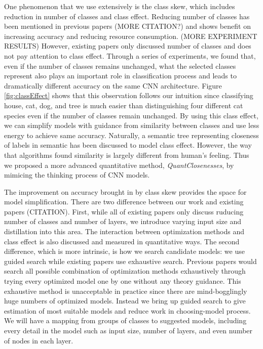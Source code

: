 \documentclass{article}
\begin{document}
One phenomenon that we use extensively is the class skew, which includes reduction in number of classes and class effect. Reducing number of classes has been mentioned in previous papers \cite{han2016mcdnn} \cite{shen2016fast} (MORE CITATION?) and shows benefit on increasing accuracy and reducing resource consumption. (MORE EXPERIMENT RESULTS) However, existing papers only discussed number of classes and does not pay attention to class effect. Through a series of experiments, we found that, even if the number of classes remains unchanged, what the selected classes represent also plays an important role in classification process and leads to dramatically different accuracy on the same CNN architecture. Figure \ref{fig:classEffect} shows that this observation follows our intuition since classifying house, cat, dog, and tree is much easier than distinguishing four different cat species even if the number of classes remain unchanged. By using this class effect, we can simplify models with guidance from similarity between classes and use less energy to achieve same accuracy. Naturally, a semantic tree representing closeness of labels in semantic has been discussed to model class effect. However, the way that algorithms found similarity is largely different from human's feeling. Thus we proposed a more advanced quantitative method, \textit{QuantClosenesses}, by mimicing the thinking process of CNN models. 

The improvement on accuracy brought in by class skew provides the space for model simplification. There are two difference between our work and existing papers (CITATION). First, while all of existing papers only discuss ruducing number of classes and number of layers, we introduce varying input size and distillation into this area. The interaction between optimization methods and class effect is also discussed and measured in quantitative ways. The second difference, which is more intrinsic, is how we search candidate models: we use guided search while existing papers use exhaustive search. Previous papers would search all possible combination of optimization methods exhaustively through trying every optimized model one by one without any theory guidance. This exhaustive method is unacceptable in practice since there are mind-bogglingly huge numbers of optimized models. Instead we bring up guided search to give estimation of most suitable models and reduce work in choosing-model process. We will have a mapping from groups of classes to suggested models, including every detail in the model such as input size, number of layers, and even number of nodes in each layer.
\end{document}
